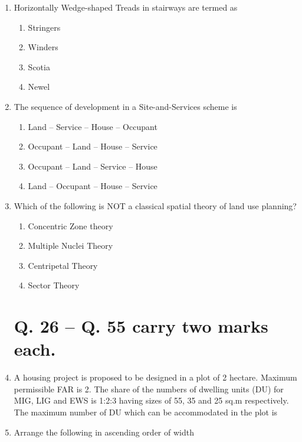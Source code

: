 \documentclass[journal,12pt,onecolumn]{IEEEtran}
\theoremstyle{remark}
\begin{document}
\begin{enumerate}
\item Horizontally Wedge-shaped Treads in stairways are termed as

\hfill{}
\begin{enumerate}
\item Stringers
\item Winders
\item Scotia
\item Newel
\end{enumerate}

\item The sequence of development in a Site-and-Services scheme is

\hfill{}
\begin{enumerate}
\item Land -- Service -- House -- Occupant
\item Occupant -- Land -- House -- Service
\item Occupant -- Land -- Service -- House
\item Land -- Occupant -- House -- Service
\end{enumerate}

\item Which of the following is NOT a classical spatial theory of land use planning?

\hfill{}
\begin{enumerate}
\item Concentric Zone theory
\item Multiple Nuclei Theory
\item Centripetal Theory
\item Sector Theory
\end{enumerate}

\section*{Q. 26 – Q. 55 carry two marks each.}

\item A housing project is proposed to be designed in a plot of 2 hectare. Maximum permissible FAR is 2. The share of the numbers of dwelling units (DU) for MIG, LIG and EWS is 1:2:3 having sizes of 55, 35 and 25 sq.m respectively. The maximum number of DU which can be accommodated in the plot is \underline{\hspace{2cm}}

\item Arrange the following in ascending order of width


\end{enumerate}
\end{document}
